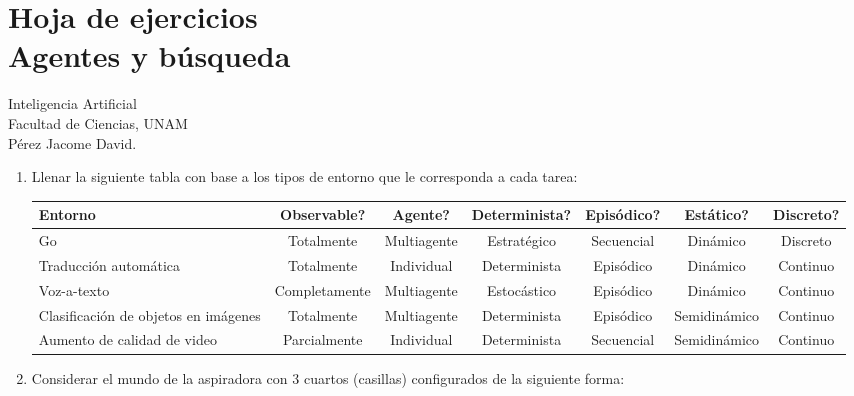 \documentclass{article}
\begin{document}
\section*{Hoja de ejercicios \\ Agentes y búsqueda}
\noindent
Inteligencia Artificial \\
Facultad de Ciencias, UNAM\\
Pérez Jacome David.

\vspace{15pt}

\noindent
\small{
\begin{enumerate}
\item Llenar la siguiente tabla con base a los tipos de entorno que le corresponda a cada tarea:
    \begin{table}[!h]
        \small
        \centering
        \begin{tabular}{|p{1.7cm} | c | c | c | c | c | c|} \hline
            \textbf{Entorno} & \textbf{Observable?} & \textbf{Agente?} & \textbf{Determinista?} & \textbf{Episódico?} & \textbf{Estático?} & \textbf{Discreto?} \\ \hline
            Go & Totalmente & Multiagente & Estratégico & Secuencial & Dinámico & Discreto \\ \hline
            Traducción automática & Totalmente & Individual & Determinista & Episódico & Dinámico & Continuo \\ \hline
            Voz-a-texto & Completamente & Multiagente & Estocástico  & Episódico & Dinámico & Continuo \\ \hline
            Clasificación de objetos en imágenes & Totalmente & Multiagente & Determinista & Episódico & Semidinámico & Continuo \\ \hline
            Aumento de calidad de video & Parcialmente & Individual & Determinista & Secuencial & Semidinámico & Continuo \\ \hline
        \end{tabular}
    \end{table}
    \item Considerar el mundo de la aspiradora con 3 cuartos (casillas) configurados de la siguiente forma:
    

\end{enumerate}}
\end{document}
